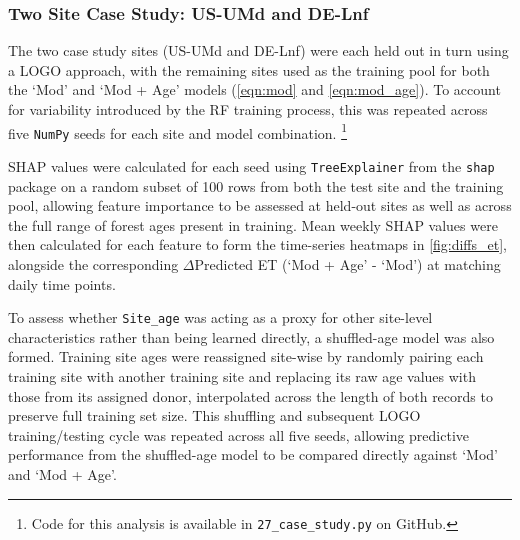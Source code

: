 \subsubsection{Two Site Case Study: US-UMd and DE-Lnf} \label{sec:case_study}


The two case study sites (US-UMd and DE-Lnf) were each held out in turn using a \ac{LOGO} approach, with the remaining sites used as the training pool for both the `Mod' and `Mod + Age' models (\autoref{eqn:mod} and \autoref{eqn:mod_age}). To account for variability introduced by the \ac{RF} training process, this was repeated across five \texttt{NumPy} seeds for each site and model combination. \footnote{Code for this analysis is available in \texttt{27\_case\_study.py} on GitHub.}
\par SHAP values were calculated for each seed using \texttt{TreeExplainer} from the \texttt{shap} package on a random subset of 100 rows from both the test site and the training pool, allowing feature importance to be assessed at held-out sites as well as across the full range of forest ages present in training. Mean weekly SHAP values were then calculated for each feature to form the time-series heatmaps in \autoref{fig:diffs_et}, alongside the corresponding $\Delta$Predicted \ac{ET} (`Mod + Age' - `Mod') at matching daily time points.
\par To assess whether \texttt{Site\_age} was acting as a proxy for other site-level characteristics rather than being learned directly, a shuffled-age model was also formed. Training site ages were reassigned site-wise by randomly pairing each training site with another training site and replacing its raw age values with those from its assigned donor, interpolated across the length of both records to preserve full training set size. This shuffling and subsequent \ac{LOGO} training/testing cycle was repeated across all five seeds, allowing predictive performance from the shuffled-age model to be compared directly against `Mod' and `Mod + Age'.






\renewcommand{\theequation}{\arabic{equation}}









